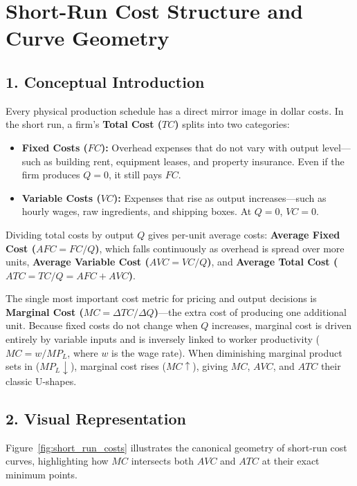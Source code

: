 \documentclass[11pt,letterpaper]{article}
\begin{document}
\section{Short-Run Cost Structure and Curve Geometry}

\subsection*{1. Conceptual Introduction}
Every physical production schedule has a direct mirror image in dollar costs. In the short run, a firm's \textbf{Total Cost ($TC$)} splits into two categories:
\begin{itemize}
    \item \textbf{Fixed Costs ($FC$):} Overhead expenses that do not vary with output level—such as building rent, equipment leases, and property insurance. Even if the firm produces $Q = 0$, it still pays $FC$.
    \item \textbf{Variable Costs ($VC$):} Expenses that rise as output increases—such as hourly wages, raw ingredients, and shipping boxes. At $Q = 0$, $VC = 0$.
\end{itemize}

Dividing total costs by output $Q$ gives per-unit average costs: \textbf{Average Fixed Cost ($AFC = FC/Q$)}, which falls continuously as overhead is spread over more units, \textbf{Average Variable Cost ($AVC = VC/Q$)}, and \textbf{Average Total Cost ($ATC = TC/Q = AFC + AVC$)}.

The single most important cost metric for pricing and output decisions is \textbf{Marginal Cost ($MC = \Delta TC / \Delta Q$)}—the extra cost of producing one additional unit. Because fixed costs do not change when $Q$ increases, marginal cost is driven entirely by variable inputs and is inversely linked to worker productivity ($MC = w / MP_L$, where $w$ is the wage rate). When diminishing marginal product sets in ($MP_L \downarrow$), marginal cost rises ($MC \uparrow$), giving $MC$, $AVC$, and $ATC$ their classic U-shapes.

\subsection*{2. Visual Representation}
Figure~\ref{fig:short_run_costs} illustrates the canonical geometry of short-run cost curves, highlighting how $MC$ intersects both $AVC$ and $ATC$ at their exact minimum points.
\end{document}
